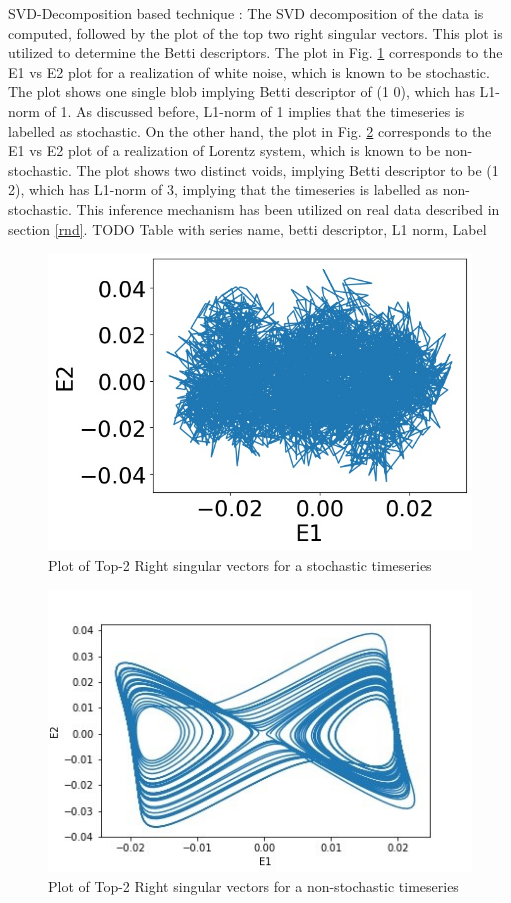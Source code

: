 \documentclass[journal]{IEEEtran}
\begin{document}
	SVD-Decomposition based technique : The SVD decomposition of the data is computed, followed by the plot of the top two right singular vectors. This plot is utilized to determine the Betti descriptors. The plot in Fig. \ref{ele2_svd} corresponds to the E1 vs E2 plot for a realization of white noise, which is known to be stochastic. The plot shows one single blob implying Betti descriptor of (1 0), which has L1-norm of 1. As discussed before,  L1-norm of 1 implies that the timeseries is labelled as stochastic. On the other hand, the plot in Fig. \ref{ele2_svd_ns} corresponds to the E1 vs E2 plot of a realization of Lorentz system, which is known to be non-stochastic.  The plot shows two distinct voids, implying Betti descriptor to be (1 2), which has L1-norm of 3, implying that the timeseries is labelled as non-stochastic. This inference mechanism has been utilized on real data described in section \ref{rnd}.
	TODO Table with series name, betti descriptor, L1 norm, Label 
	\begin{figure}[ht]
		\centering
		\includegraphics[width=0.8\linewidth]{svd_white_noise.jpg}
		\caption{Plot of Top-2 Right singular vectors for a stochastic timeseries}
		\label{ele2_svd}
	\end{figure}
	\begin{figure}[ht]
		\centering
		\includegraphics[width=0.8\linewidth]{svd_lorenz.JPG}
		\caption{Plot of Top-2 Right singular vectors for a non-stochastic timeseries}
		\label{ele2_svd_ns}
	\end{figure}
\end{document}
